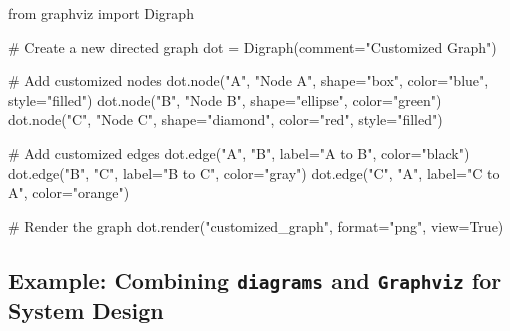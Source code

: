 \documentclass[
  letterpaper,
  DIV=11,
  numbers=noendperiod]{scrreprt}
\newenvironment{Shaded}{\begin{snugshade}}{\end{snugshade}}
\newcommand{\BuiltInTok}[1]{\textcolor[rgb]{0.00,0.23,0.31}{#1}}
\newcommand{\CommentTok}[1]{\textcolor[rgb]{0.37,0.37,0.37}{#1}}
\newcommand{\ImportTok}[1]{\textcolor[rgb]{0.00,0.46,0.62}{#1}}
\newcommand{\NormalTok}[1]{\textcolor[rgb]{0.00,0.23,0.31}{#1}}
\newcommand{\OperatorTok}[1]{\textcolor[rgb]{0.37,0.37,0.37}{#1}}
\newcommand{\StringTok}[1]{\textcolor[rgb]{0.13,0.47,0.30}{#1}}
\newcommand{\VariableTok}[1]{\textcolor[rgb]{0.07,0.07,0.07}{#1}}
\begin{document}
\begin{Shaded}
\begin{Highlighting}[]
\ImportTok{from}\NormalTok{ graphviz }\ImportTok{import}\NormalTok{ Digraph}

\CommentTok{\# Create a new directed graph}
\NormalTok{dot }\OperatorTok{=}\NormalTok{ Digraph(comment}\OperatorTok{=}\StringTok{"Customized Graph"}\NormalTok{)}

\CommentTok{\# Add customized nodes}
\NormalTok{dot.node(}\StringTok{"A"}\NormalTok{, }\StringTok{"Node A"}\NormalTok{, shape}\OperatorTok{=}\StringTok{"box"}\NormalTok{, color}\OperatorTok{=}\StringTok{"blue"}\NormalTok{, style}\OperatorTok{=}\StringTok{"filled"}\NormalTok{)}
\NormalTok{dot.node(}\StringTok{"B"}\NormalTok{, }\StringTok{"Node B"}\NormalTok{, shape}\OperatorTok{=}\StringTok{"ellipse"}\NormalTok{, color}\OperatorTok{=}\StringTok{"green"}\NormalTok{)}
\NormalTok{dot.node(}\StringTok{"C"}\NormalTok{, }\StringTok{"Node C"}\NormalTok{, shape}\OperatorTok{=}\StringTok{"diamond"}\NormalTok{, color}\OperatorTok{=}\StringTok{"red"}\NormalTok{, style}\OperatorTok{=}\StringTok{"filled"}\NormalTok{)}

\CommentTok{\# Add customized edges}
\NormalTok{dot.edge(}\StringTok{"A"}\NormalTok{, }\StringTok{"B"}\NormalTok{, label}\OperatorTok{=}\StringTok{"A to B"}\NormalTok{, color}\OperatorTok{=}\StringTok{"black"}\NormalTok{)}
\NormalTok{dot.edge(}\StringTok{"B"}\NormalTok{, }\StringTok{"C"}\NormalTok{, label}\OperatorTok{=}\StringTok{"B to C"}\NormalTok{, color}\OperatorTok{=}\StringTok{"gray"}\NormalTok{)}
\NormalTok{dot.edge(}\StringTok{"C"}\NormalTok{, }\StringTok{"A"}\NormalTok{, label}\OperatorTok{=}\StringTok{"C to A"}\NormalTok{, color}\OperatorTok{=}\StringTok{"orange"}\NormalTok{)}

\CommentTok{\# Render the graph}
\NormalTok{dot.render(}\StringTok{"customized\_graph"}\NormalTok{, }\BuiltInTok{format}\OperatorTok{=}\StringTok{"png"}\NormalTok{, view}\OperatorTok{=}\VariableTok{True}\NormalTok{)}
\end{Highlighting}
\end{Shaded}

\subsection{\texorpdfstring{Example: Combining \texttt{diagrams} and
\texttt{Graphviz} for System
Design}{Example: Combining diagrams and Graphviz for System Design}}\label{example-combining-diagrams-and-graphviz-for-system-design}
\end{document}
